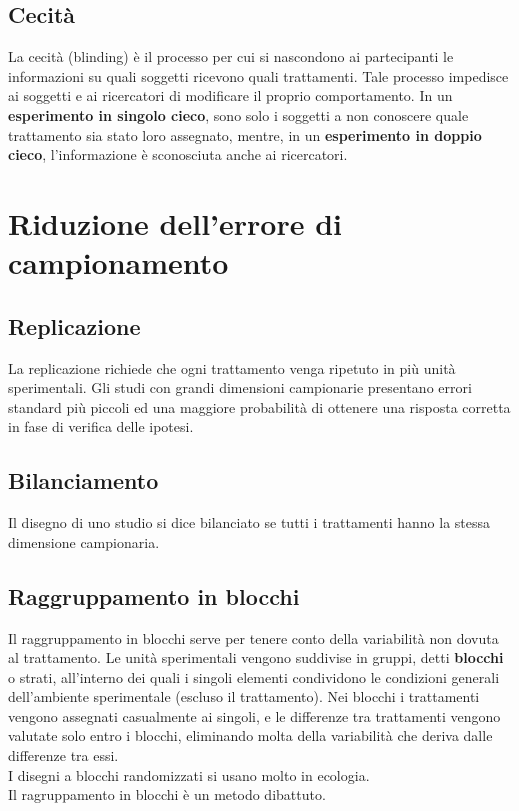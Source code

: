 \documentclass[10pt, draft]{book}
\begin{document}
\subsection{Cecità}

La cecità (blinding) è il processo per cui si nascondono ai partecipanti le informazioni su quali soggetti ricevono quali trattamenti. Tale processo impedisce ai soggetti e ai ricercatori di modificare il proprio comportamento. In un \textbf{esperimento in singolo cieco}, sono solo i soggetti a non conoscere quale trattamento sia stato loro assegnato, mentre, in un \textbf{esperimento in doppio cieco}, l'informazione è sconosciuta anche ai ricercatori.

\section{Riduzione dell'errore di campionamento}

\subsection{Replicazione}

La replicazione richiede che ogni trattamento venga ripetuto in più unità sperimentali. Gli studi con grandi dimensioni campionarie presentano errori standard più piccoli ed una maggiore probabilità di ottenere una risposta corretta in fase di verifica delle ipotesi.

\subsection{Bilanciamento}

Il disegno di uno studio si dice bilanciato se tutti i trattamenti hanno la stessa dimensione campionaria. 

\subsection{Raggruppamento in blocchi}

Il raggruppamento in blocchi serve per tenere conto della variabilità non dovuta al trattamento. Le unità sperimentali vengono suddivise in gruppi, detti \textbf{blocchi} o strati, all'interno dei quali i singoli elementi condividono le condizioni generali dell'ambiente sperimentale (escluso il trattamento). Nei blocchi i trattamenti vengono assegnati casualmente ai singoli, e le differenze tra trattamenti vengono valutate solo entro i blocchi, eliminando molta della variabilità che deriva dalle differenze tra essi.\\
I disegni a blocchi randomizzati si usano molto in ecologia.\\
Il ragruppamento in blocchi è un metodo dibattuto.
\end{document}
